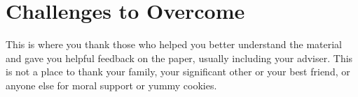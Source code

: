 \documentclass[sigplan,screen,nonacm]{acmart}
\begin{document}
\section{Challenges to Overcome}
\label{sec:Challenges to Overcome}




\begin{acks}
This is where you thank those who helped you better understand the material 
and gave you helpful feedback on the paper, usually including your adviser. 
This is not a place to thank your family, your significant other or your best friend, 
or anyone else  for moral support or yummy cookies. 
\end{acks}



\end{document}
